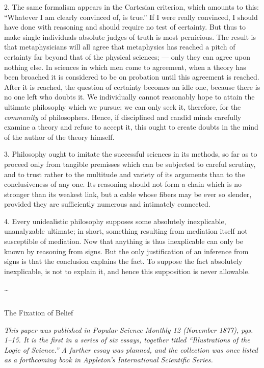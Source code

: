 \documentclass[]{article}
\newcommand{\hbreak}{\par\noindent\begin{tabular*}{\linewidth}{c}\hline\hline\end{tabular*}\par}
\newcommand*{\itemtitle}[1]{\pagebreak[2]\hbreak\begin{center}{\Large\sc #1}\end{center}}
\newcommand*{\itemcomment}[1]{\noindent\emph{#1}}
\begin{document}
2. The same formalism appears in the Cartesian criterion, which amounts to this: ``Whatever I am clearly convinced of, is true.'' If I were really convinced, I should have done with reasoning and should require no test of certainty. But thus to make single individuals absolute judges of truth is most pernicious. The result is that metaphysicians will all agree that metaphysics has reached a pitch of certainty far beyond that of the physical sciences; --- only they can agree upon nothing else. In sciences in which men come to agreement, when a theory has been broached it is considered to be on probation until this agreement is reached. After it is reached, the question of certainty becomes an idle one, because there is no one left who doubts it. We individually cannot reasonably hope to attain the ultimate philosophy which we pursue; we can only seek it, therefore, for the \emph{community} of philosophers. Hence, if disciplined and candid minds carefully examine a theory and refuse to accept it, this ought to create doubts in the mind of the author of the theory himself.

3. Philosophy ought to imitate the successful sciences in its methods, so far as to proceed only from tangible premisses which can be subjected to careful scrutiny, and to trust rather to the multitude and variety of its arguments than to the conclusiveness of any one. Its reasoning should not form a chain which is no stronger than its weakest link, but a cable whose fibers may be ever so slender, provided they are sufficiently numerous and intimately connected.

4. Every unidealistic philosophy supposes some absolutely inexplicable, unanalyzable ultimate; in short, something resulting from mediation itself not susceptible of mediation. Now that anything is thus inexplicable can only be known by reasoning from signs. But the only justification of an inference from signs is that the conclusion explains the fact. To suppose the fact absolutely inexplicable, is not to explain it, and hence this supposition is never allowable.

\ldots



\itemtitle{The Fixation of Belief}

\itemcomment{This paper was published in \emph{Popular Science Monthly} 12 (November 1877), pgs. 1--15. It is the first in a series of six essays, together titled ``Illustrations of the Logic of Science.'' A further essay was planned, and the collection was once listed as a forthcoming book in Appleton's International Scientific Series.}
\end{document}
